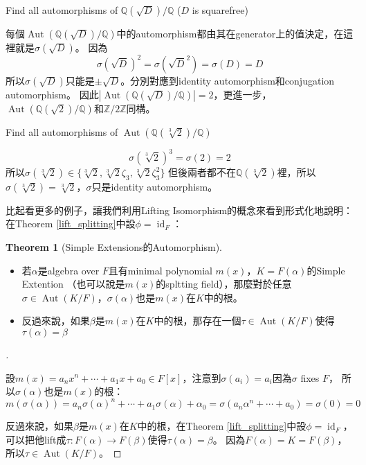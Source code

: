 \documentclass[12pt]{article}
\theoremstyle{definition}
\newtheorem{thm}{Theorem}
\newenvironment{proofs}[1][\proofname]{%
  \begin{proof}[#1]$ $\par\nobreak\ignorespaces
}{%
  \end{proof}
}
\newcommand{\QQ}{\mathbb Q}
\newcommand{\ZZ}{\mathbb Z}
\DeclareMathOperator{\Aut}{Aut}
\DeclareMathOperator{\id}{id}
\begin{document}
\begin{ex}
	Find all automorphisms of $\QQ(\sqrt{D})/\QQ$ ($D$ is squarefree)

	每個$\Aut(\QQ(\sqrt{D})/\QQ)$中的automorphism都由其在generator上的值決定，在這裡就是$\sigma(\sqrt{D})$。
	因為
	\[\sigma(\sqrt{D})^2=\sigma(\sqrt{D}^2)=\sigma(D)=D\]
	所以$\sigma(\sqrt{D})$只能是$\pm\sqrt{D}$。分別對應到identity automorphism和conjugation automorphism。
	因此$|\Aut(\QQ(\sqrt{D})/\QQ)|=2$，更進一步，$\Aut(\QQ(\sqrt{2})/\QQ)$和$\ZZ/2\ZZ$同構。
\end{ex}

\begin{ex} Find all automorphisms of $\Aut(\QQ(\sqrt[3]{2})/\QQ)$

	\[\sigma(\sqrt[3]{2})^3=\sigma(2)=2\]
	所以$\sigma(\sqrt[3]{2})\in \{\sqrt[3]{2},\sqrt[3]{2}\zeta_3, \sqrt[3]{2}\zeta_3^2\}$
	但後兩者都不在$\QQ(\sqrt[3]{2})$裡，所以$\sigma(\sqrt[3]{2})=\sqrt[3]{2}$，$\sigma$只是identity automorphism。

\end{ex}

比起看更多的例子，讓我們利用Lifting Isomorphism的概念來看到形式化地說明：在Theorem \ref{lift_splitting}中設$\phi=\id_F$：
\begin{thm}[Simple Extensions的Automorphism]\leavevmode
	\begin{itemize}
		\item 若$\alpha$是algebra over $F$且有minimal polynomial $m(x)$，$K=F(\alpha)$的Simple Extention
		      （也可以說是$m(x)$的spltting field），那麼對於任意$\sigma\in\Aut(K/F)$，$\sigma(\alpha)$也是$m(x)$在$K$中的根。
		\item 反過來說，如果$\beta$是$m(x)$在$K$中的根，那存在一個$\tau\in\Aut(K/F)$使得$\tau(\alpha)=\beta$

	\end{itemize}\end{thm}

\begin{proofs}
	設$m(x)=a_n x^n+\cdots+a_1x+ a_0\in F[x]$，注意到$\sigma(a_i)=a_i$因為$\sigma$ fixes $F$，
	所以$\sigma(\alpha)$也是$m(x)$的根：
	\[m(\sigma(\alpha))=a_n\sigma(\alpha)^n+\cdots+a_1 \sigma(\alpha)+\alpha_0=\sigma(a_n \alpha^n +\cdots + a_0)=\sigma(0)=0\]

	反過來說，如果$\beta$是$m(x)$在$K$中的根，在Theorem \ref{lift_splitting}中設$\phi=\id_F$，可以把他lift成$\tau:F(\alpha)\to F(\beta)$使得$\tau(\alpha)=\beta$。
	因為$F(\alpha)=K=F(\beta)$，所以$\tau\in\Aut(K/F)$。
\end{proofs}
\end{document}

